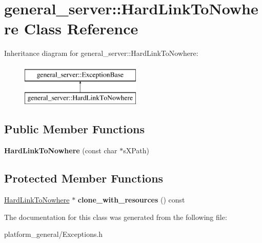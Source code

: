 \hypertarget{classgeneral__server_1_1HardLinkToNowhere}{\section{general\-\_\-server\-:\-:\-Hard\-Link\-To\-Nowhere \-Class \-Reference}
\label{classgeneral__server_1_1HardLinkToNowhere}
}
\-Inheritance diagram for general\-\_\-server\-:\-:\-Hard\-Link\-To\-Nowhere\-:\begin{figure}[H]
\begin{center}
\leavevmode
\includegraphics[height=2.000000cm]{classgeneral__server_1_1HardLinkToNowhere}
\end{center}
\end{figure}
\subsection*{\-Public \-Member \-Functions}
\begin{DoxyCompactItemize}
\item 
\hypertarget{classgeneral__server_1_1HardLinkToNowhere_a442d6764a999c354d2de7ae742f90e84}{{\bfseries \-Hard\-Link\-To\-Nowhere} (const char $\ast$s\-X\-Path)}\label{classgeneral__server_1_1HardLinkToNowhere_a442d6764a999c354d2de7ae742f90e84}

\end{DoxyCompactItemize}
\subsection*{\-Protected \-Member \-Functions}
\begin{DoxyCompactItemize}
\item 
\hypertarget{classgeneral__server_1_1HardLinkToNowhere_adde3c70e47c2af535cda1a70a6915635}{\hyperlink{classgeneral__server_1_1HardLinkToNowhere}{\-Hard\-Link\-To\-Nowhere} $\ast$ {\bfseries clone\-\_\-with\-\_\-resources} () const }\label{classgeneral__server_1_1HardLinkToNowhere_adde3c70e47c2af535cda1a70a6915635}

\end{DoxyCompactItemize}


\-The documentation for this class was generated from the following file\-:\begin{DoxyCompactItemize}
\item 
platform\-\_\-general/\-Exceptions.\-h\end{DoxyCompactItemize}
